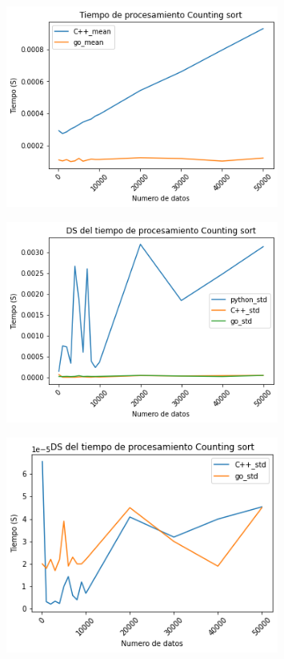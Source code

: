 \documentclass{article}
\begin{document}
\begin{enumerate}
\begin{figure}[H]
\centering
\includegraphics[width=0.8\textwidth]{Imagen/CS2.png}
\label{fig:QuickSort}
\end{figure}
\begin{figure}[H]
\centering
\includegraphics[width=0.8\textwidth]{Imagen/CS3.png}
\label{fig:QuickSort}
\end{figure}

\begin{figure}[H]
\centering
\includegraphics[width=0.8\textwidth]{Imagen/CS4.png}
\label{fig:QuickSort}
\end{figure}



\end{enumerate}
\end{document}
